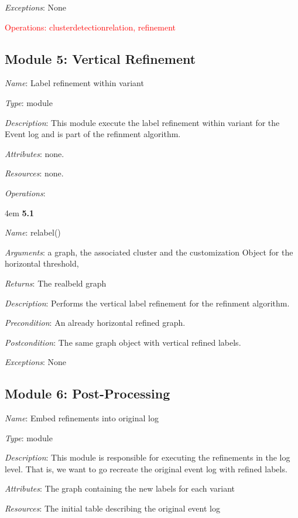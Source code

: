 \documentclass[notitlepage]{article}
\begin{document}
\begin{flushleft}
\textit{Exceptions}: None
\par
\endgroup


\textcolor{red}{Operations: clusterdetectionrelation, refinement}

\subsection{Module 5: Vertical Refinement}
\textit{Name}: Label refinement within variant

\textit{Type}: module

\textit{Description}: This module execute the label refinement within variant for the Event log and is part of the refinment algorithm.

\textit{Attributes}: none.

\textit{Resources}: none.

\textit{Operations}: 
\medskip

\par
\begingroup
\leftskip4em
\textbf{5.1} 

\textit{Name}: relabel()

\textit{Arguments}: a graph, the associated cluster and the customization Object for the horizontal threshold, 

\textit{Returns}: The realbeld graph

\textit{Description}: Performs the vertical label refinement for the refinment algorithm.

\textit{Precondition}: An already horizontal refined graph.

\textit{Postcondition}: The same graph object with vertical refined labels.

\textit{Exceptions}: None
\par
\endgroup




\subsection{Module 6: Post-Processing}
\textit{Name}: Embed refinements into original log 

\textit{Type}: module

\textit{Description}: This module is responsible for executing the refinements in the log level. That is, we want to go recreate the original event log with refined labels.

\textit{Attributes}: The graph containing the new labels for each variant

\textit{Resources}: The initial table describing the original event log


\end{flushleft}
\end{document}
